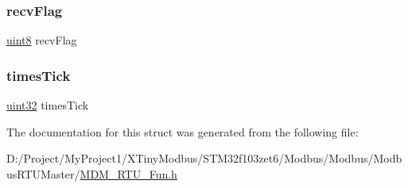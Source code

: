 \subsubsection{\texorpdfstring{recv\+Flag}{recvFlag}}
{\footnotesize\ttfamily \mbox{\hyperlink{_m_d___r_t_u___type_8h_adde6aaee8457bee49c2a92621fe22b79}{uint8}} recv\+Flag}

\mbox{\label{struct_p_modbus___r_t_u_a0148764b78c9ff76c2105964bf00daa7}} 
\subsubsection{\texorpdfstring{times\+Tick}{timesTick}}
{\footnotesize\ttfamily \mbox{\hyperlink{_m_d___r_t_u___type_8h_a1134b580f8da4de94ca6b1de4d37975e}{uint32}} times\+Tick}



The documentation for this struct was generated from the following file\+:\begin{DoxyCompactItemize}
\item 
D\+:/\+Project/\+My\+Project1/\+X\+Tiny\+Modbus/\+S\+T\+M32f103zet6/\+Modbus/\+Modbus/\+Modbus\+R\+T\+U\+Master/\mbox{\hyperlink{_m_d_m___r_t_u___fun_8h}{M\+D\+M\+\_\+\+R\+T\+U\+\_\+\+Fun.\+h}}\end{DoxyCompactItemize}
